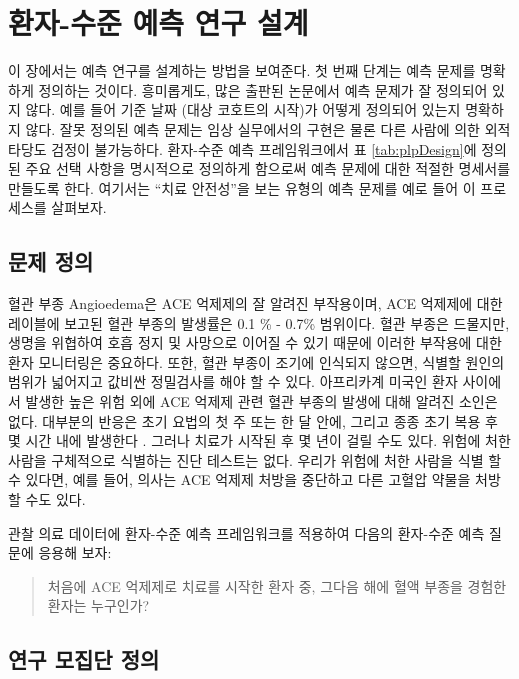 \documentclass[10.5pt]{book}
\theoremstyle{definition}
\theoremstyle{definition}
\theoremstyle{definition}
\theoremstyle{remark}
\begin{document}
\section{환자-수준 예측 연구 설계}\label{----}

이 장에서는 예측 연구를 설계하는 방법을 보여준다. 첫 번째 단계는 예측
문제를 명확하게 정의하는 것이다. 흥미롭게도, 많은 출판된 논문에서 예측
문제가 잘 정의되어 있지 않다. 예를 들어 기준 날짜 (대상 코호트의 시작)가
어떻게 정의되어 있는지 명확하지 않다. 잘못 정의된 예측 문제는 임상
실무에서의 구현은 물론 다른 사람에 의한 외적 타당도 검정이 불가능하다.
환자-수준 예측 프레임워크에서 표 \ref{tab:plpDesign}에 정의된 주요 선택
사항을 명시적으로 정의하게 함으로써 예측 문제에 대한 적절한 명세서를
만들도록 한다. 여기서는 ``치료 안전성''을 보는 유형의 예측 문제를 예로
들어 이 프로세스를 살펴보자. 

\subsection{문제 정의}\label{--3}

혈관 부종 Angioedema은 ACE 억제제의 잘 알려진 부작용이며, ACE 억제제에
대한 레이블에 보고된 혈관 부종의 발생률은 0.1 \% - 0.7\% 범위이다.
\citep{byrd_2006} 혈관 부종은 드물지만, 생명을 위협하여 호흡 정지 및
사망으로 이어질 수 있기 때문에 이러한 부작용에 대한 환자 모니터링은
중요하다. \citep{norman_2013} 또한, 혈관 부종이 조기에 인식되지 않으면,
식별할 원인의 범위가 넓어지고 값비싼 정밀검사를 해야 할 수 있다.
\citep{norman_2013, thompson_1993} 아프리카계 미국인 환자 사이에서
발생한 높은 위험 외에 ACE 억제제 관련 혈관 부종의 발생에 대해 알려진
소인은 없다. \citep{byrd_2006} 대부분의 반응은 초기 요법의 첫 주 또는 한
달 안에, 그리고 종종 초기 복용 후 몇 시간 내에 발생한다
\citep{circardi_2004}. 그러나 치료가 시작된 후 몇 년이 걸릴 수도 있다.
\citep{mara_1996} 위험에 처한 사람을 구체적으로 식별하는 진단 테스트는
없다. 우리가 위험에 처한 사람을 식별 할 수 있다면, 예를 들어, 의사는 ACE
억제제 처방을 중단하고 다른 고혈압 약물을 처방할 수도
있다. 

관찰 의료 데이터에 환자-수준 예측 프레임워크를 적용하여 다음의 환자-수준
예측 질문에 응용해 보자:

\begin{quote}
처음에 ACE 억제제로 치료를 시작한 환자 중, 그다음 해에 혈액 부종을
경험한 환자는 누구인가?
\end{quote}

\subsection{연구 모집단 정의}\label{--}
\end{document}
